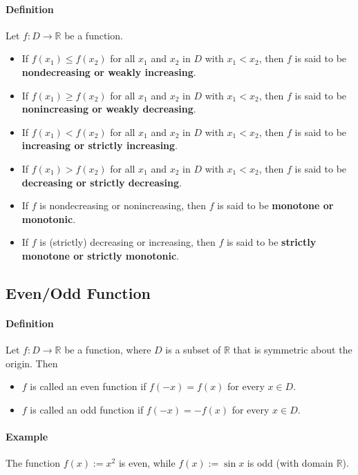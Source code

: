 \documentclass[12pt]{article}
\begin{document}
\paragraph{Definition} Let $f : D \rightarrow \mathbb{R}$ be a function.
\begin{itemize} 
     \item If $f(x_1) \leq f(x_2)$ for all $x_1$ and $x_2$ in $D$ with $x_1 < x_2$, then $f$ is
     said to be \textbf{nondecreasing or weakly increasing}.
     \item If $f(x_1) \geq f(x_2)$ for all $x_1$ and $x_2$ in $D$ with $x_1 < x_2$, then $f$ is
     said to be \textbf{nonincreasing or weakly decreasing}.
     \item  If $f(x_1) < f(x_2)$ for all $x_1$ and $x_2$ in $D$ with $x_1 < x_2$, then $f$ is
     said to be \textbf{increasing or strictly increasing}.
     \item  If $f(x_1) > f(x_2)$ for all $x_1$ and $x_2$ in $D$ with $x_1 < x_2$, then $f$ is
     said to be \textbf{decreasing or strictly decreasing}.
     \item  If $f$ is nondecreasing or nonincreasing, then $f$ is said to be
     \textbf{monotone or monotonic}.
     \item  If $f$ is (strictly) decreasing or increasing, then $f$ is said to be
     \textbf{strictly monotone or strictly monotonic}.
\end{itemize}
\subsection{Even/Odd Function}
\paragraph{Definition} Let $f : D \rightarrow \mathbb{R}$ be a function, where $D$ is a subset of $\mathbb{R}$ that is
symmetric about the origin. Then
\begin{itemize} 
    \item $f$ is called an even function if $f(-x) = f(x)$ for every $x \in D$.
    \item $f$ is called an odd function if $f(-x) = -f(x)$ for every $x \in D$.
\end{itemize}

\paragraph{Example}
The function $f(x) := x^2$ is even, while $f(x) := \sin x$ is odd (with
domain $\mathbb{R}$).
\end{document}
